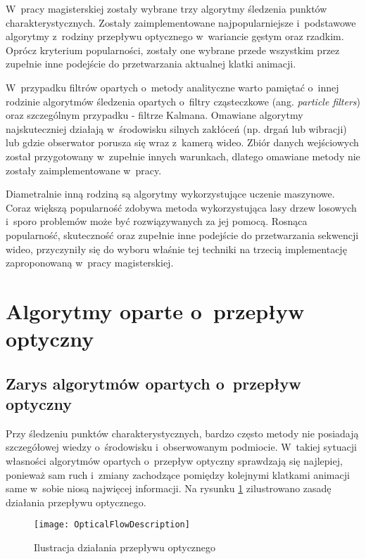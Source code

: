     W~pracy magisterskiej zostały wybrane trzy algorytmy śledzenia punktów charakterystycznych. Zostały zaimplementowane najpopularniejsze i~podstawowe algorytmy z~rodziny przepływu optycznego w~wariancie gęstym oraz rzadkim. Oprócz kryterium popularności, zostały one wybrane przede wszystkim przez zupełnie inne podejście do przetwarzania aktualnej klatki animacji.

    W~przypadku filtrów opartych o~metody analityczne warto pamiętać o~innej rodzinie algorytmów śledzenia opartych o~filtry cząsteczkowe (ang. \textit{particle filters}) oraz szczególnym przypadku - filtrze Kalmana. Omawiane algorytmy najskuteczniej działają w~środowisku silnych zakłóceń (np. drgań lub wibracji) lub gdzie obserwator porusza się wraz z~kamerą wideo. Zbiór danych wejściowych został przygotowany w~zupełnie innych warunkach, dlatego omawiane metody nie zostały zaimplementowane w~pracy.

    Diametralnie inną rodziną są algorytmy wykorzystujące uczenie maszynowe. Coraz większą popularność zdobywa metoda wykorzystująca lasy drzew losowych i~sporo problemów może być rozwiązywanych za jej pomocą. Rosnąca popularność, skuteczność oraz zupełnie inne podejście do przetwarzania sekwencji wideo, przyczyniły się do wyboru właśnie tej techniki na trzecią implementację zaproponowaną w~pracy magisterskiej.

  \newpage
  \section{Algorytmy oparte o~przepływ optyczny}\label{Section_OpticalFlow}

    \subsection{Zarys algorytmów opartych o~przepływ optyczny}

      Przy śledzeniu punktów charakterystycznych, bardzo często metody nie posiadają szczegółowej wiedzy o~środowisku i~obserwowanym podmiocie. W~takiej sytuacji własności algorytmów opartych o~przepływ optyczny sprawdzają się najlepiej, ponieważ sam ruch i~zmiany zachodzące pomiędzy kolejnymi klatkami animacji same w~sobie niosą najwięcej informacji\cite{OpticalFlowNonPriori05}. Na rysunku \ref{fig:OpticalFlowDescription} zilustrowano zasadę działania przepływu optycznego.

        \begin{figure}[!ht]
          \centering
          \texttt{[image: OpticalFlowDescription]}
          \caption[Ilustracja działania przepływu optycznego]{Ilustracja działania przepływu optycznego}
          \label{fig:OpticalFlowDescription}
        \end{figure}

